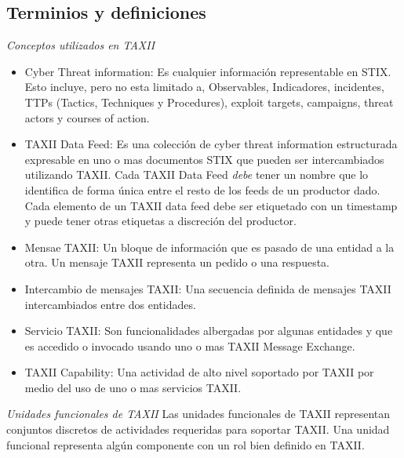 \subsection{Terminios y definiciones}
\emph{Conceptos utilizados en TAXII}
\begin{itemize}
 \item Cyber Threat information: Es cualquier información representable en STIX. 
 Esto incluye, pero no esta limitado a, Observables, Indicadores, incidentes, 
 TTPs (Tactics, Techniques y Procedures), exploit targets, campaigns, threat 
 actors y courses of action.
 \item TAXII Data Feed: Es una colección de cyber threat information 
 estructurada expresable en uno o mas documentos STIX que pueden ser 
 intercambiados utilizando TAXII. Cada TAXII Data Feed \emph{debe} tener un 
 nombre que lo identifica de forma única entre el resto de los feeds de un 
 productor dado. Cada elemento de un TAXII data feed debe ser etiquetado con un 
 timestamp y puede tener otras etiquetas a discreción del productor.
 \item Mensae TAXII: Un bloque de información que es pasado de una entidad a la 
 otra. Un mensaje TAXII representa un pedido o una respuesta.
 \item Intercambio de mensajes TAXII: Una secuencia definida de mensajes TAXII 
 intercambiados entre dos entidades.
\item Servicio TAXII: Son funcionalidades albergadas por algunas entidades y que 
es accedido o invocado usando uno o mas TAXII Message Exchange.
\item TAXII Capability: Una actividad de alto nivel soportado por TAXII por 
medio del uso de uno o mas servicios TAXII.
\end{itemize}

\emph{Unidades funcionales de TAXII}
Las unidades funcionales de TAXII representan conjuntos discretos de actividades 
requeridas para soportar TAXII. Una unidad funcional representa algún componente 
con un rol bien definido en TAXII.

